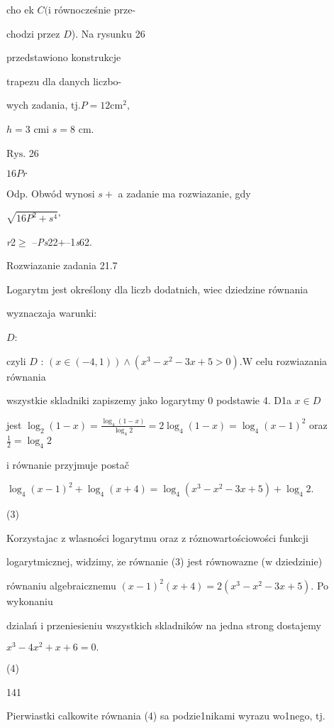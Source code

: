 \documentclass[a4paper,12pt]{article}
\begin{document}
cho ek $C (\mathrm{i}$ równocześnie prze-

chodzi przez $D$). Na rysunku 26

przedstawiono konstrukcje

trapezu dla danych liczbo-

wych zadania, $\mathrm{t}\mathrm{j}. P = 12 \mathrm{c}\mathrm{m}^{2},$

$h=3$ cmi $s=8$ cm.

$\mathrm{R}\mathrm{y}\mathrm{s}$. 26

$16Pr$

Odp. Obwód wynosi $s+$ a zadanie ma rozwiazanie, gdy

$\sqrt{16P^{2}+s^{4}}$'

{\it r}2$\geq$ --{\it Ps}22$+$--1{\it s}62.

Rozwiazanie zadania 21.7

Logarytm jest określony dla liczb dodatnich, wiec dziedzine równania

wyznaczaja warunki:

$D$: 

czyli $D$ : $(x\in(-4,1))\wedge(x^{3}-x^{2}-3x+5>0). \mathrm{W}$ celu rozwiazania równania

wszystkie skladniki zapiszemy jako logarytmy $0$ podstawie 4. D1a $x \in D$

jest $\displaystyle \log_{2}(1-x)=\frac{\log_{4}(1-x)}{\log_{4}2}=2\log_{4}(1-x)=\log_{4}(x-1)^{2}$ oraz $\displaystyle \frac{1}{2}=\log_{4}2$

$\mathrm{i}$ równanie przyjmuje postač

$\log_{4}(x-1)^{2}+\log_{4}(x+4)=\log_{4}(x^{3}-x^{2}-3x+5)+\log_{4}2.$

(3)

Korzystajac $\mathrm{z}$ wlasności logarytmu oraz $\mathrm{z}$ róznowartościowości funkcji

logarytmicznej, widzimy, $\dot{\mathrm{z}}\mathrm{e}$ równanie (3) jest równowazne ($\mathrm{w}$ dziedzinie)

równaniu algebraicznemu $(x-1)^{2}(x+4)=2(x^{3}-x^{2}-3x+5)$. Po wykonaniu

dzialań $\mathrm{i}$ przeniesieniu wszystkich skladników na jedna strong dostajemy

$x^{3}-4x^{2}+x+6=0.$

(4)





141

Pierwiastki calkowite równania (4) sa podzie1nikami wyrazu wo1nego, $\mathrm{t}\mathrm{j}.$
\end{document}
